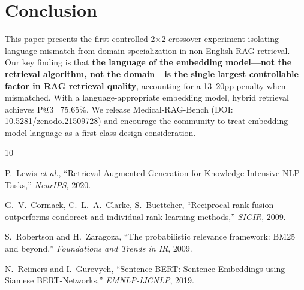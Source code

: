 ﻿\documentclass[11pt,a4paper]{article}
\begin{document}
\section{Conclusion}

This paper presents the first controlled 2$\times$2 crossover experiment isolating language mismatch from domain specialization in non-English RAG retrieval. Our key finding is that \textbf{the language of the embedding model---not the retrieval algorithm, not the domain---is the single largest controllable factor in RAG retrieval quality}, accounting for a 13--20pp penalty when mismatched. With a language-appropriate embedding model, hybrid retrieval achieves P@3=75.65\%. We release Medical-RAG-Bench (DOI: 10.5281/zenodo.21509728) and encourage the community to treat embedding model language as a first-class design consideration.

\begin{thebibliography}{10}

P.~Lewis \emph{et al.}, ``Retrieval-Augmented Generation for Knowledge-Intensive NLP Tasks,'' \emph{NeurIPS}, 2020.

G.~V.~Cormack, C.~L.~A.~Clarke, S.~Buettcher, ``Reciprocal rank fusion outperforms condorcet and individual rank learning methods,'' \emph{SIGIR}, 2009.

S.~Robertson and H.~Zaragoza, ``The probabilistic relevance framework: BM25 and beyond,'' \emph{Foundations and Trends in IR}, 2009.

N.~Reimers and I.~Gurevych, ``Sentence-BERT: Sentence Embeddings using Siamese BERT-Networks,'' \emph{EMNLP-IJCNLP}, 2019.

\end{thebibliography}
\end{document}
